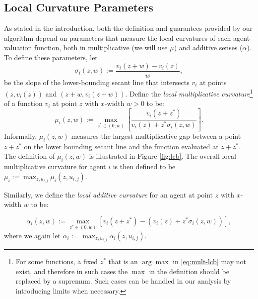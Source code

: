 \subsection{Local Curvature Parameters}
\label{subsec:lcb}
As stated in the introduction, both the definition and guarantees provided by our algorithm depend on parameters that measure the local curvatures of each agent valuation function, both in multiplicative (we will use $\mu$) and additive senses ($\alpha$). To define these parameters, let
\begin{equation}
\label{eq:lcb-slope}
\sigma_{i}(z,w) := \frac{v_i(z+w) - v_i(z)}{w},
\end{equation}
be the slope of the lower-bounding  secant line that intersects $v_i$ at points $(z,v_i(z))$ and $(z+w, v_i(z+w))$. Define the  {\em local multiplicative curvature}\footnote{For some functions, a fixed $z^*$ that is an $\arg\max$ in \eqref{eq:mult-lcb} may not exist, and therefore in such cases the $\max$ in the definition should be replaced by a supremum. Such cases can be handled in our analysis by introducing limits when necessary.} of a function $v_i$ at point $z$ with $x$-width $w > 0$ to be:
\begin{equation}
\label{eq:mult-lcb}
\mu_{i}(z, w) := \max_{z^* \in \left(0,w\right)} \left[\frac{v_i(z+z^*)}{v_i(z) + z^*\sigma_i(z,w)} \right].
\end{equation}
Informally, $\mu_{i}(z, w)$ measures the largest multiplicative gap
between a point $z+ z^*$ on the lower bounding secant line and the function evaluated at $z+ z^*$. The definition of $\mu_{i}(z, w)$
is illustrated in Figure \ref{fig:lcb}. The overall local multiplicative curvature for agent $i$ is then defined to be $\mu_i := \max_{z, u_{i,j}} \mu_{i}(z, u_{i,j})$. 

Similarly, we define the {\em local additive curvature} for an agent at point $z$ with $x$-width $w$ to be: 

\begin{equation}
\label{eq:add-lcb}
\alpha_{i}(z, w) := \max_{z^* \in \left(0,w\right)} \left[v_i(z+z^*) - (v_i(z) + z^* \sigma_i(z,w))\right],
\end{equation}
where we again let $\alpha_i := \max_{z, u_{i,j}} \alpha_{i}(z, u_{i,j})$.


